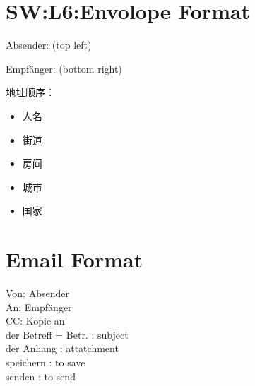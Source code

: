 \section{SW:L6:Envolope Format}
Absender: (top left)\\
\begin{center}
    \begin{minipage}[t]{0.9\textwidth}
    \end{minipage}
\end{center}
Empfänger: (bottom right)\\
\begin{center}
    \begin{minipage}[t]{0.9\textwidth}
    \end{minipage}
\end{center}
地址顺序：
\begin{itemize}
    \item 人名
    \item 街道
    \item 房间
    \item 城市
    \item 国家
\end{itemize}

\section{Email Format}
\noindent
Von: Absender \\
An: Empfänger \\
CC: Kopie an  \\
der Betreff \sqr[color=green] = Betr. : subject \\
der Anhang \sqr[color=green]: attatchment \\
speichern \cir[color=gray]: to save \\
senden \cir[color=gray]: to send \\

